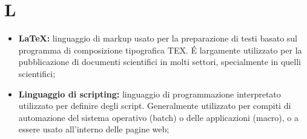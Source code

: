 %


\section*{\Huge L} %
\label{sec:l}
	\begin{itemize}
		\item \textbf{\LaTeX:} linguaggio di markup usato per la preparazione di testi basato sul programma di composizione tipografica TEX. É largamente utilizzato per la pubblicazione di documenti scientifici in molti settori, specialmente in quelli scientifici;
		\item \textbf{Linguaggio di scripting:} linguaggio di programmazione interpretato utilizzato per definire degli script. Generalmente utilizzato per compiti di automazione del sistema operativo (batch) o delle applicazioni (macro), o a essere usato all'interno delle pagine web;
	\end{itemize}
\pagebreak

